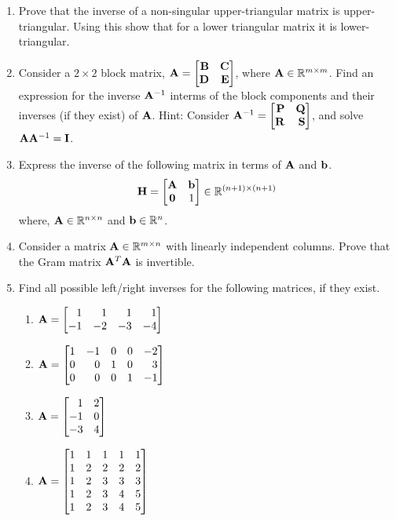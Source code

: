 \documentclass[12pt]{article}
\def\mf{\ensuremath\mathbf}
\def\mb{\ensuremath\mathbb}
\def\bmx{\ensuremath\begin{bmatrix*}[r]}
\def\emx{\ensuremath\end{bmatrix*}}
\begin{document}
\begin{enumerate}
    \item Prove that the inverse of a non-singular upper-triangular matrix is upper-triangular. Using this show that for a lower triangular matrix it is lower-triangular.

    \item Consider a $2 \times 2$ block matrix, $\mf{A} = \bmx \mf{B} & \mf{C}\\\mf{D} & \mf{E}\emx$, where $\mf{A} \in \mb{R}^{m \times m}$. Find an expression for the inverse $\mf{A}^{-1}$ interms of the block components and their inverses (if they exist) of $\mf{A}$. Hint: Consider $\mf{A}^{-1} = \bmx \mf{P} & \mf{Q}\\ \mf{R} & \mf{S}\emx$, and solve $\mf{A}\mf{A}^{-1} = \mf{I}$.

    \item Express the inverse of the following matrix in terms of $\mf{A}$ and $\mf{b}$. 
    \[ \mf{H} = \begin{bmatrix*}
    \mf{A} & \mf{b}\\
    \mathbf{0} & 1\\
    \end{bmatrix*} \in \mathbb{R}^{\left(n+1\right) \times \left(n+1\right)}
    \]
    where, $\mf{A} \in \mathbb{R}^{n \times n}$ and $\mf{b} \in \mathbb{R}^n$. 

    \item Consider a matrix $\mf{A} \in \mathbb{R}^{m \times n}$ with linearly independent columns. Prove that the Gram matrix $\mf{A}^T\mf{A}$ is invertible.
    
    \item Find all possible left/right inverses for the following matrices, if they exist.
    \begin{enumerate}
        \item $\mf{A} = \bmx 1 & 1 & 1 & 1\\ -1 & -2 & -3 & -4\emx$
        \item $\mf{A} = \bmx 1 & -1 & 0 & 0 & -2\\ 0 & 0 & 1 & 0 & 3\\0 & 0 & 0 & 1 & -1\emx$
        \item $\mf{A} = \bmx 1 & 2\\-1 & 0\\-3 & 4\emx$
        \item $\mf{A} = \bmx 1 & 1 & 1 & 1 & 1\\
        1 & 2 & 2 & 2 & 2\\
        1 & 2 & 3 & 3 & 3\\
        1 & 2 & 3 & 4 & 5\\
        1 & 2 & 3 & 4 & 5
        \emx$
    \end{enumerate}
    

\end{enumerate}
\end{document}
